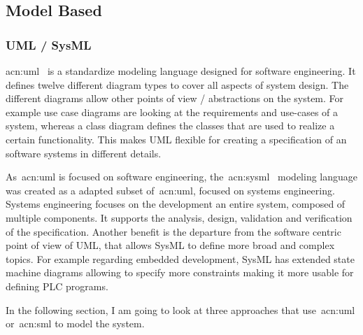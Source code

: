 \subsection{Model Based}
\label{sec:sub:mb}




\subsubsection{UML / SysML}

\acrfull{acn:uml}~\cite{UML:2-5-1} is a standardize modeling language designed for software engineering.
It defines twelve different diagram types to cover all aspects of system design.
The different diagrams allow other points of view / abstractions on the system.
For example use case diagrams are looking at the requirements and use-cases of a system, whereas a class diagram defines the classes that are used to realize a certain functionality.
This makes UML flexible for creating a specification of an software systems in different details.

As~\acrshort{acn:uml} is focused on software engineering, the~\acrfull{acn:sysml}~\cite{SysML:1-6} modeling language was created as a adapted subset of~\acrshort{acn:uml}, focused on systems engineering.
Systems engineering focuses on the development an entire system, composed of multiple components.
It supports the analysis, design, validation and verification of the specification.
Another benefit is the departure from the software centric point of view of UML, that allows SysML to define more broad and complex topics.
For example regarding embedded development, SysML has extended state machine diagrams allowing to specify more constraints making it more usable for defining PLC programs.

In the following section, I am going to look at three approaches that use~\acrshort{acn:uml} or~\acrshort{acn:sml} to model the system.

